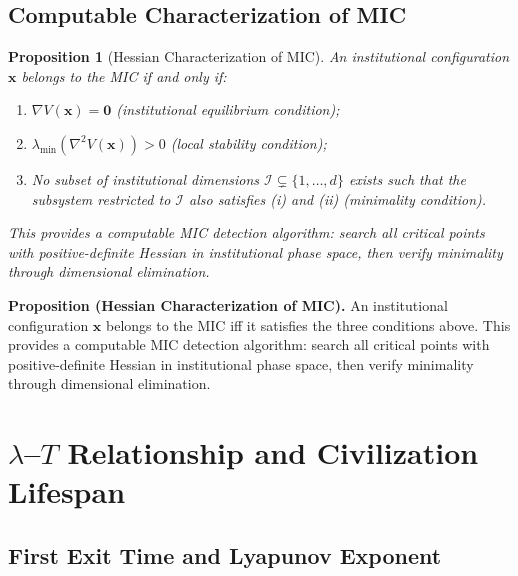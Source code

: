 \documentclass[12pt,a4paper]{article}
\newtheorem{proposition}[theorem]{Proposition}
\theoremstyle{definition}
\newcommand{\calI}{\mathcal{I}}
\newcommand{\lb}{\lambda}
\newcommand{\lambdamin}{\lambda_{\min}}
\newcommand{\Lyap}{V}
\newcommand{\grad}{\nabla}
\begin{document}
\subsection{Computable Characterization of MIC}
\label{sec:mic_computable}

\begin{proposition}[Hessian Characterization of MIC]
\label{prop:mic_hessian}
An institutional configuration $\mathbf{x}$ belongs to the MIC if and only if:
\begin{enumerate}[label=(\roman*), leftmargin=*]
    \item $\grad \Lyap(\mathbf{x}) = \mathbf{0}$ (institutional equilibrium condition);
    \item $\lambdamin(\nabla^2 \Lyap(\mathbf{x})) > 0$ (local stability condition);
    \item No subset of institutional dimensions $\calI \subsetneq \{1, \ldots, d\}$ exists such that the subsystem restricted to $\calI$ also satisfies (i) and (ii) (minimality condition).
\end{enumerate}
This provides a computable MIC detection algorithm: search all critical points with positive-definite Hessian in institutional phase space, then verify minimality through dimensional elimination.
\end{proposition}

\noindent
\textbf{Proposition (Hessian Characterization of MIC).}
An institutional configuration $\mathbf{x}$ belongs to the MIC iff it satisfies the three conditions above. This provides a computable MIC detection algorithm: search all critical points with positive-definite Hessian in institutional phase space, then verify minimality through dimensional elimination.

\section{$\lb$--$T$ Relationship and Civilization Lifespan}
\label{sec:lambda_T}

\subsection{First Exit Time and Lyapunov Exponent}
\label{sec:first_exit}
\end{document}
